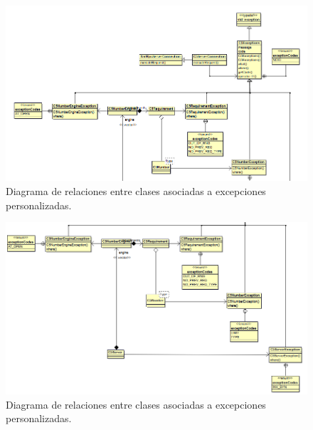 \documentclass[a4paper,12pt]{article}
\begin{document}
\begin{figure}[htbp]
    \centering
    \includegraphics[width=\textwidth]{C5/Esquema_general_C5_server_excepciones_1.PNG}
    \caption{Diagrama de relaciones entre clases asociadas a excepciones personalizadas.}
    \label{fig:excepciones_personalizadas1}
\end{figure}

\begin{figure}[thbp]
    \centering
    \includegraphics[width=\textwidth]{C5/Esquema_general_C5_server_excepciones_2.PNG}
    \caption{Diagrama de relaciones entre clases asociadas a excepciones personalizadas.}
    \label{fig:excepciones_personalizadas2}
\end{figure}
\end{document}
